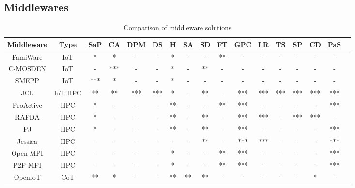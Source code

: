 \documentclass[12pt]{article}
\begin{document}
\subsection{Middlewares}
\begin{table}
	\caption{Comparison of middleware solutions}
	\tiny
	\centering
	\begin{tabular}{ccccccccccccccccl}
		\toprule
		Middleware & Type    & SaP & CA  & DPM & DS  & H  & SA & SD & FT & GPC      & LR  & TS  & SP  & CD  & PaS \\
		\midrule
		FamiWare   & IoT     & *   & *   & -   & -   & *  & -  & -  & ** & -        & -   & -   & -   & -   & -   \\
		C-MOSDEN   & IoT     & -   & *** & -   & -   & *  & -  & ** & -  & -        & -   & -   & -   & -   & -   \\ 
		SMEPP      & IoT     & *** & *   & -   & -   & *  & -  & -  & -  & -        & -   & -   & -   & -   & -   \\ 
		JCL        & IoT-HPC & **  & **  & *** & *** & *  & -  & ** & -  & ***      & *** & *** & *** & *** & *** \\
		ProActive  & HPC     & *   & -   & -   & -   & ** & -  & -  & ** & ***      & -   & -   & -   & -   & *** \\ 
		RAFDA      & HPC     & *   & -   & -   & -   & ** & -  & ** & -  & ***      & *** & -   & *** & *** & -   \\ 
		PJ         & HPC     & *   & -   & -   & -   & ** & -  & ** & -  & ***      & -   & -   & -   & -   & *** \\ 
		Jessica    & HPC     & -   & -   & -   & -   & -  & -  & ** & -  & ***      & *** & -   & -   & -   & *** \\ 
		Open MPI   & HPC     & -   & -   & -   & -   & *  & -  & -  & ** & ***      & -   & -   & -   & -   & *** \\ 
		P2P-MPI    & HPC     & -   & -   & -   & -   & *  & -  & -  & ** & ***      & -   & -   & -   & -   & *** \\ 
		OpenIoT    & CoT     & **  & *   & -   & -   & ** & ** & ** & -  & -        & -   & -   & -   & *   & -   \\ 
		\bottomrule
	\end{tabular}
	\label{tab:middlewares}
\end{table}
\end{document}
